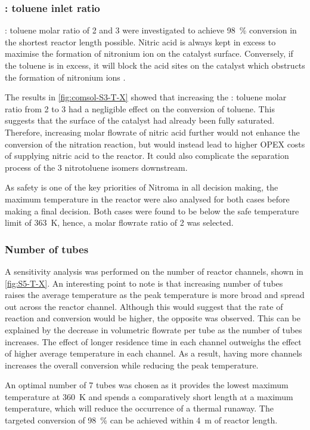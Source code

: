 \subsubsection{ : toluene inlet ratio}

 : toluene molar ratio of 2 and 3 were investigated to achieve \SI{98}{\percent} conversion in the shortest reactor length possible. Nitric acid is always kept in excess to maximise the formation of nitronium ion on the catalyst surface. Conversely, if the toluene is in excess, it will block the acid sites on the catalyst which obstructs the formation of nitronium ions \cite{vassena_selective_1999}.

The results in \cref{fig:comsol-S3-T-X} showed that increasing the  : toluene molar ratio from 2 to 3 had a negligible effect on the conversion of toluene. This suggests that the surface of the catalyst had already been fully saturated. Therefore, increasing molar flowrate of nitric acid further would not enhance the conversion of the nitration reaction, but would instead lead to higher OPEX costs of supplying nitric acid to the reactor. It could also complicate the separation process of the 3 nitrotoluene isomers downstream. 

As safety is one of the key priorities of Nitroma in all decision making, the maximum temperature in the reactor were also analysed for both cases before making a final decision. Both cases were found to be below the safe temperature limit of \SI{363}{\K}, hence, a molar flowrate ratio of 2 was selected.

\subsubsection{Number of tubes}
A sensitivity analysis was performed on the number of reactor channels, shown in \cref{fig:S5-T-X}. An interesting point to note is that increasing number of tubes raises the average temperature as the peak temperature is more broad and spread out across the reactor channel. Although this would suggest that the rate of reaction and conversion would be higher, the opposite was observed. This can be explained by the decrease in volumetric flowrate per tube as the number of tubes increases. The effect of longer residence time in each channel outweighs the effect of higher average temperature in each channel. As a result, having more channels increases the overall conversion while reducing the peak temperature.

An optimal number of 7 tubes was chosen as it provides the lowest maximum temperature at \SI{360}{\K} and spends a comparatively short length at a maximum temperature, which will reduce the occurrence of a thermal runaway. The targeted conversion of \SI{98}{\percent} can be achieved within \SI{4}{\metre} of reactor length. 

